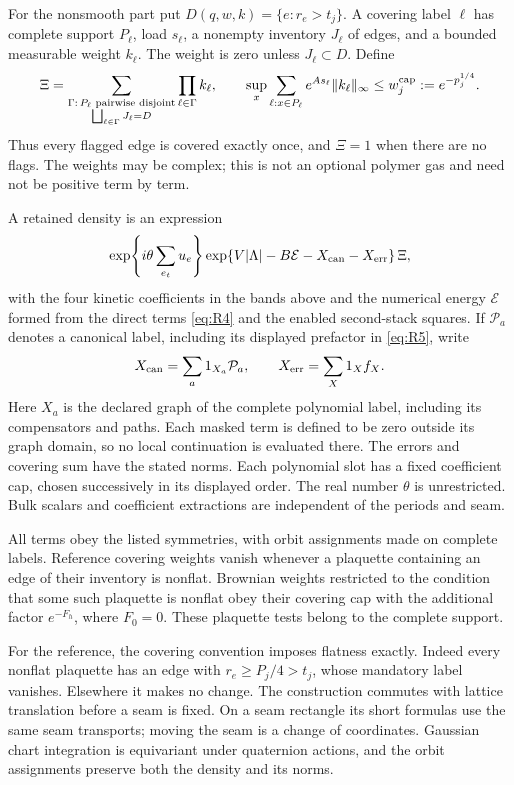 For the nonsmooth part put $D(q,w,k)=\{e:r_e>t_j\}$.  A covering label
$\ell$ has complete support $P_\ell$, load $s_\ell$, a nonempty inventory
$J_\ell$ of edges, and a bounded measurable weight $k_\ell$.  The weight
is zero unless $J_\ell\subset D$.  Define
\[
 \Xi=\sum_{\substack{\Gamma:\,P_\ell\text{ pairwise disjoint}\\
              \bigsqcup_{\ell\in\Gamma}J_\ell=D}}
                    \prod_{\ell\in\Gamma}k_\ell,
 \qquad
 \sup_x\sum_{\ell:x\in P_\ell}e^{As_\ell}\|k_\ell\|_\infty
                  \le w_j^{\rm cap}:=e^{-p_j^{1/4}}.
\]
Thus every flagged edge is covered exactly once, and $\Xi=1$ when
there are no flags.  The weights may be complex; this is not an optional
polymer gas and need not be positive term by term.

\begin{definition}\label{def:rg-retained-class}
A retained density is an expression
\begin{equation}
 \exp\!\left\{i\theta\sum_{e_t}u_e\right\}
 \exp\{V|\Lambda|-B\mathcal E-X_{\rm can}-X_{\rm err}\}\,\Xi,
 \label{eq:R2}
\end{equation}
with the four kinetic coefficients in the bands above and the numerical
energy $\mathcal E$ formed from the direct terms \eqref{eq:R4} and
the enabled second-stack squares.  If $\mathcal P_a$ denotes a canonical
label, including its displayed prefactor in \eqref{eq:R5}, write
\[
 X_{\rm can}=\sum_a1_{X_a}\mathcal P_a,
 \qquad X_{\rm err}=\sum_X1_Xf_X.
\]
Here $X_a$ is the declared graph of the complete polynomial label,
including its compensators and paths.  Each masked term is defined to
be zero outside its graph domain, so no local continuation is evaluated
there.  The errors and covering sum have the stated norms.  Each polynomial
slot has a fixed coefficient cap, chosen successively in its displayed
order.  The real number $\theta$ is unrestricted.  Bulk scalars and
coefficient extractions are independent of the periods and seam.

All terms obey the listed symmetries, with orbit assignments made on
complete labels.  Reference covering weights vanish whenever a
plaquette containing an edge of their inventory is nonflat.  Brownian
weights restricted to the condition that some such plaquette is
nonflat obey their covering cap with the additional factor $e^{-F_h}$,
where $F_0=0$.  These plaquette tests belong to the complete support.
\end{definition}

For the reference, the covering convention imposes flatness exactly.
Indeed every nonflat plaquette has an edge with $r_e\ge P_j/4>t_j$,
whose mandatory label vanishes.  Elsewhere it makes no change.  The
construction commutes with lattice translation before a seam is fixed.
On a seam rectangle its short formulas use the same seam transports;
moving the seam is a change of coordinates.  Gaussian chart integration
is equivariant under quaternion actions, and the orbit assignments
preserve both the density and its norms.

